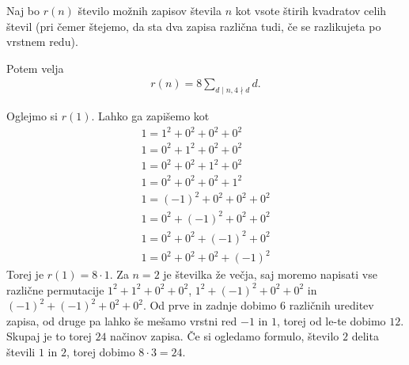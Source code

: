 \begin{izrek}
    \label{jacobi-four-squares}
    Naj bo \(r(n)\) število možnih zapisov števila \(n\) kot vsote štirih kvadratov celih števil (pri čemer štejemo, da sta dva zapisa različna tudi, če se razlikujeta po vrstnem redu).

    Potem velja
    \begin{align*}
        r(n) = 8\sum_{d\mid n, 4\nmid d} d.
    \end{align*}
\end{izrek}
\begin{primer}
    Oglejmo si \(r(1)\).
    Lahko ga zapišemo kot
    \begin{align*}
        1 = 1^2 + 0^2 + 0^2 + 0^2    \\
        1 = 0^2 + 1^2 + 0^2 + 0^2    \\
        1 = 0^2 + 0^2 + 1^2 + 0^2    \\
        1 = 0^2 + 0^2 + 0^2 + 1^2    \\
        1 = (-1)^2 + 0^2 + 0^2 + 0^2 \\
        1 = 0^2 + (-1)^2 + 0^2 + 0^2 \\
        1 = 0^2 + 0^2 + (-1)^2 + 0^2 \\
        1 = 0^2 + 0^2 + 0^2 + (-1)^2
    \end{align*}
    Torej je \(r(1) = 8 \cdot 1\). Za \(n=2\) je številka že večja, saj moremo napisati vse različne permutacije \(1^2 + 1^2+0^2+0^2\), \(1^2 + (-1)^2+0^2+0^2\) in \((-1)^2 + (-1)^2+0^2+0^2\). Od prve in zadnje dobimo \(6\) različnih ureditev zapisa, od druge pa lahko še mešamo vrstni red \(-1\) in \(1\), torej od le-te dobimo \(12\). Skupaj je to torej \(24\) načinov zapisa. Če si ogledamo formulo, število \(2\) delita števili \(1\) in \(2\), torej dobimo \(8\cdot 3 = 24\).
\end{primer}
